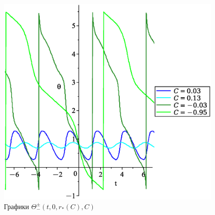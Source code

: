\documentclass{article}
\begin{document}
\begin{figure}[ht!]%
    \begin{center}
    \includegraphics[scale = 0.48]{thetan2.eps}
    \caption{Графики $\Theta_-^\pm(t,0,r_*(C), C)$}%
    \label{fig:eight}
    \end{center}%
\end{figure}
\end{document}
